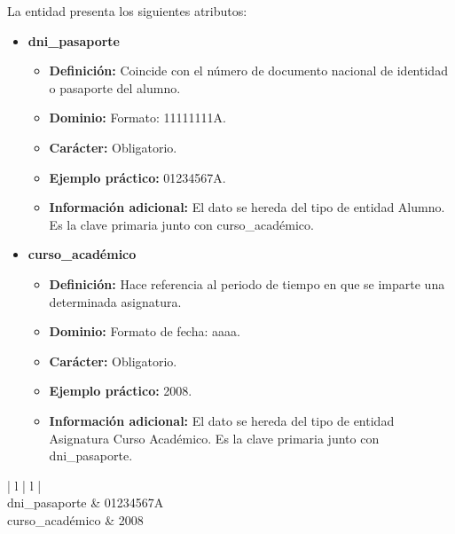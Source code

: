 \begin{description}
   \item[Descripción de los atributos] La entidad presenta los siguientes
   atributos:

   \begin{itemize}
   \item \textbf{dni\_pasaporte}
      \begin{itemize}
         \item \textbf{Definición:} Coincide con el número de documento nacional
         de identidad o pasaporte del alumno.
         \item \textbf{Dominio:} Formato: 11111111A.
         \item \textbf{Carácter:} Obligatorio.
         \item \textbf{Ejemplo práctico:} 01234567A.
         \item \textbf{Información adicional:} El dato se hereda del tipo de entidad Alumno. Es la clave primaria junto con curso\_académico.
      \end{itemize}
   \item \textbf{curso\_académico}
      \begin{itemize}
         \item \textbf{Definición:} Hace referencia al periodo de tiempo en que se imparte una determinada asignatura.
         \item \textbf{Dominio:} Formato de fecha: aaaa.
         \item \textbf{Carácter:}  Obligatorio.
         \item \textbf{Ejemplo práctico:} 2008.
         \item \textbf{Información adicional:} El dato se hereda del tipo de entidad Asignatura Curso Académico. Es la clave primaria junto con dni\_pasaporte.
      \end{itemize}
   \end{itemize}

   \item[Ejemplo práctico]

   \item \begin{center}
            \begin{tabular}{ | l | l | }
            \hline
             \\
            \hline
            dni\_pasaporte & 01234567A \\
            \hline
            curso\_académico & 2008\\
            \hline
            \end{tabular}
         \end{center}
   \end{description}

